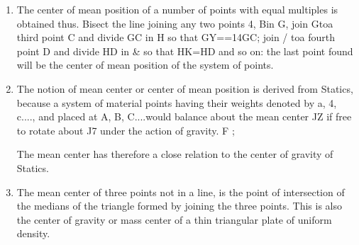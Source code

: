 \begin{enumerate}
%
%
%
%
%
%
%
%
%
%
%
%
%
%
%
\item The center of mean position of a number of points with equal multiples is
    obtained thus. Bisect the line joining any two points 4, Bin G, join Gtoa
    third point C and divide GC in H so that GY==14GC; join / toa fourth point D
    and divide HD in \& so that H{K=}HD and so on: the last point found will be
    the center of mean position of the system of points.

\item The notion of mean center or center of mean position is derived from
    Statics, because a system of material points having their weights denoted by
    a, 4, c...., and placed at A, B, C....would balance about the mean center JZ
    if free to rotate about J7 under the action of gravity. F ;

    The mean center has therefore a close relation to the center of gravity of
    Statics.


\item The mean center of three points not in a line, is the point of
    intersection of the medians of the triangle formed by joining the three
    points. This is also the center of gravity or mass center of a thin
    triangular plate of uniform density.


%
%
%
%
%
%
%
%
%
%
%
%
%
%



\end{enumerate}
